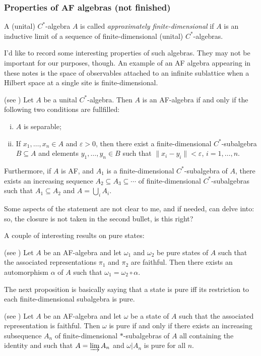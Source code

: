 \subsubsection{Properties of AF algebras (not finished)}
\begin{definition}
A (unital) $C^*$-algebra $A$ is called \emph{approximately finite-dimensional} if $A$ is an inductive limit of a sequence of finite-dimensional (unital) $C^*$-algebras.
\end{definition}
I'd like to record some interesting properties of such algebras. They may not be important for our purposes, though. An example of an AF algebra appearing in these notes is the space of observables attached to an infinite sublattice when a Hilbert space at a single site is finite-dimensional.
\begin{proposition} (see \cite{bratteli})
Let $A$ be a unital $C^*$-algebra. Then $A$ is an AF-algebra if and only if the following two conditions are fullfilled:
\begin{enumerate}[(i)]
\item $A$ is separable;
\item If $x_1,\ldots,x_n \in A$ and $\varepsilon > 0$, then there exist a finite-dimensional $C^*$-subalgebra $B \subseteq A$ and elements $y_1,\ldots,y_n \in B$ such that $\|x_i-y_i\| < \varepsilon$, $i=1,\ldots,n$.
\end{enumerate}
Furthermore, if $A$ is AF, and $A_1$ is a finite-dimensional $C^*$-subalgebra of $A$, there exists an increasing sequence $A_2 \subseteq A_3 \subseteq \cdots $ of finite-dimensional $C^*$-subalgebras such that $A_1 \subseteq A_2$ and $A = \bigcup_{i}A_i$.
\end{proposition}
Some aspects of the statement are not clear to me, and if needed, can delve into: so, the closure is not taken in the second bullet, is this right?

A couple of interesting results on pure states:
\begin{proposition}(see \cite{bratteli})
Let $A$ be an AF-algebra and let $\omega_1$ and $\omega_2$ be pure states of $A$ such that the associated representations $\pi_1$ and $\pi_2$ are faithful. Then there exists an automorphism $\alpha$ of $A$ such that $\omega_1 = \omega_2 \circ \alpha$.
\end{proposition}
The next proposition is basically saying that a state is pure iff its restriction to each finite-dimensional subalgebra is pure.
\begin{proposition}(see \cite{bratteli})
Let $A$ be an AF-algebra and let $\omega$ be a state of $A$ such that the associated representation is faithful. Then $\omega$ is pure if and only if there exists an increasing subsequence $A_n$ of finite-dimensional $\ast$-subalgebras of $A$ all containing the identity and such that $A = \varinjlim A_n$ and $\omega | A_n$ is pure for all $n$.
\end{proposition}